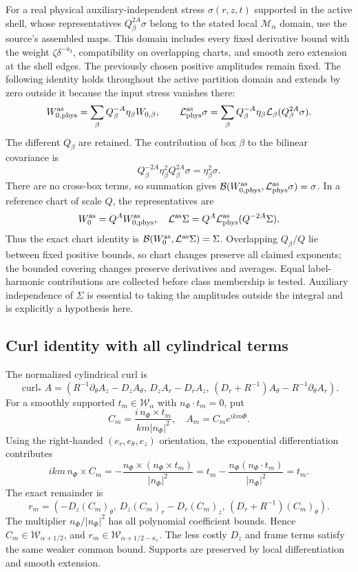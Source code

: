 \documentclass[10pt,a4paper]{article}
\begin{document}
For a real physical auxiliary-independent stress \(\sigma(r,z,t)\)
supported in the active shell, whose representatives
\(Q_\beta^{2A}\sigma\) belong to the stated local \(\mathcal M_\alpha\)
domain, use the source's assembled maps. This domain includes every fixed
derivative bound with the weight \(\zeta\delta^{-a_I}\), compatibility on
overlapping charts, and smooth zero extension at the shell edges. The
previously chosen positive amplitudes remain fixed. The following identity
holds throughout the active partition domain and extends by zero outside it
because the input stress vanishes there: \[
W_{0,\rm phys}^{\rm as}
=\sum_\beta Q_\beta^{-A}\eta_\beta W_{0,\beta},\qquad
\mathcal L_{\rm phys}^{\rm as}\sigma
=\sum_\beta Q_\beta^{-A}\eta_\beta
\mathcal L_\beta(Q_\beta^{2A}\sigma).
\] The different \(Q_\beta\) are retained. The contribution of box \(\beta\) to the bilinear covariance is \[
Q_\beta^{-2A}\eta_\beta^2Q_\beta^{2A}\sigma
=\eta_\beta^2\sigma.
\] There are no cross-box terms, so summation gives \(\mathcal B(W_{0,\rm phys}^{\rm as},\mathcal L_{\rm phys}^{\rm as}\sigma)=\sigma\). In a reference chart of scale \(Q\), the representatives are \[
W_0^{\rm as}=Q^AW_{0,\rm phys}^{\rm as},\quad
\mathcal L^{\rm as}\Sigma=Q^A\mathcal L_{\rm phys}^{\rm as}(Q^{-2A}\Sigma).
\] Thus the exact chart identity is \(\mathcal B(W_0^{\rm as},\mathcal L^{\rm as}\Sigma)=\Sigma\). Overlapping \(Q_\beta/Q\) lie between fixed positive bounds, so chart changes preserve all claimed exponents; the bounded covering changes preserve derivatives and averages. Equal label-harmonic contributions are collected before class membership is tested. Auxiliary independence of \(\Sigma\) is essential to taking the amplitudes outside the integral and is explicitly a hypothesis here.

\subsection{Curl identity with all cylindrical terms}\label{curl-identity-with-all-cylindrical-terms}

The normalized cylindrical curl is \[
\operatorname{curl}_*A=
\left(R^{-1}\partial_\theta A_z-D_zA_\theta,\,
D_zA_r-D_rA_z,\,
(D_r+R^{-1})A_\theta-R^{-1}\partial_\theta A_r\right).
\] For a smoothly supported \(t_m\in\mathcal W_\alpha\) with \(n_\Phi\cdot t_m=0\), put \[
C_m=\frac{i\,n_\Phi\times t_m}{km|n_\Phi|^2},
\quad A_m=C_me^{ikm\Phi}.
\] Using the right-handed \((e_r,e_\theta,e_z)\) orientation, the exponential differentiation contributes \[
ikm\,n_\Phi\times C_m
=-\frac{n_\Phi\times(n_\Phi\times t_m)}{|n_\Phi|^2}
=t_m-\frac{n_\Phi(n_\Phi\cdot t_m)}{|n_\Phi|^2}=t_m.
\] The exact remainder is \[
r_m=\left(-D_z(C_m)_\theta,\,
D_z(C_m)_r-D_r(C_m)_z,\,
(D_r+R^{-1})(C_m)_\theta\right).
\] The multiplier \(n_\Phi/|n_\Phi|^2\) has all polynomial coefficient bounds. Hence \(C_m\in\mathcal W_{\alpha+1/2}\), and \(r_m\in\mathcal W_{\alpha+1/2-\kappa_s}\). The less costly \(D_z\) and frame terms satisfy the same weaker common bound. Supports are preserved by local differentiation and smooth extension.
\end{document}
